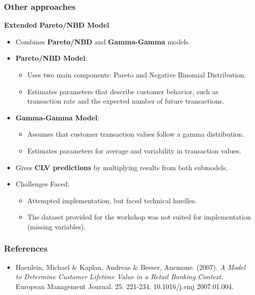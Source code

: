 \documentclass[aspectratio=169,xcolor=x11names,compress]{beamer}
\begin{document}
\begin{frame}
\frametitle{Other approaches}

\textbf{Extended Pareto/NBD Model}

\begin{itemize}
  \item Combines \textbf{Pareto/NBD} and \textbf{Gamma-Gamma} models.
  
  \item \textbf{Pareto/NBD Model}:
  \begin{itemize}
    \item Uses two main components: Pareto and Negative Binomial Distribution.
    \item Estimates parameters that describe customer behavior, such as transaction rate and the expected number of future transactions.
  \end{itemize}
  
  \item \textbf{Gamma-Gamma Model}:
  \begin{itemize}
    \item Assumes that customer transaction values follow a gamma distribution.
    \item Estimates parameters for average and variability in transaction values.
  \end{itemize}
  
  \item Gives \textbf{CLV predictions} by multiplying results from both submodels.
  
  \item Challenges Faced:
  \begin{itemize}
    \item Attempted implementation, but faced technical hurdles.
    \item The dataset provided for the workshop was not suited for implementation (missing variables).
  \end{itemize}
\end{itemize}

\end{frame}

\begin{frame}
\frametitle{References}

\begin{itemize}
	\item Haenlein, Michael \& Kaplan, Andreas \& Beeser, Anemone. (2007). \textit{A Model to Determine Customer Lifetime Value in a Retail Banking Context}. European Management Journal. 25. 221-234. 10.1016/j.emj 2007.01.004. 
\end{itemize}

\end{frame}
\end{document}
